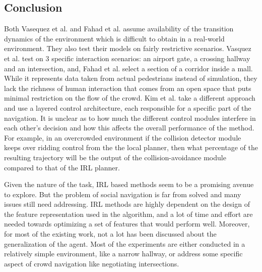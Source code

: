 \subsection*{Conclusion}
Both Vasequez et al. \cite{vasquez_inverse_2014} and Fahad et al. \cite{fahad_learning_2018} assume availability of the transition dynamics of the environment which is difficult to obtain in a real-world environment. They also test their models on fairly restrictive scenarios. Vasquez et al. test on 3 specific interaction scenarios: an airport gate, a crossing hallway and an intersection, and, Fahad et al. select a section of a corridor inside a mall. While it represents data taken from actual pedestrians instead of simulation, they lack the richness of human interaction that comes from an open space that puts minimal restriction on the flow of the crowd. Kim et al. \cite{kim_socially_2016} take a different approach and use a layered control architecture, each responsible for a specific part of the navigation. It is unclear as to how much the different control modules interfere in each other's decision and how this affects the overall performance of the method. For example, in an overcrowded environment if the collision detector module keeps over ridding control from the the local planner, then what percentage of the resulting trajectory will be the output of the collision-avoidance module compared to that of the IRL planner.
\par
Given the nature of the task, IRL based methods seem to be a promising avenue to explore. But the problem of social navigation is far from solved and many issues still need addressing. IRL methods are highly dependent on the design of the feature representation used in the algorithm, and a lot of time and effort are needed towards optimizing a set of features that would perform well. Moreover, for most of the existing work, not a lot has been discussed about the generalization of the agent. Most of the experiments are either conducted in a relatively simple environment, like a narrow hallway, or address some specific aspect of crowd navigation like negotiating intersections.
%
